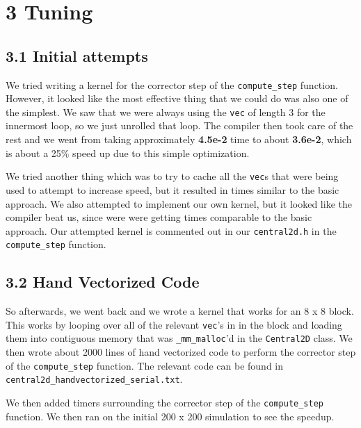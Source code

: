 \documentclass[11pt]{article}
\begin{document}
    \section{3 Tuning}

    \subsection{3.1 Initial attempts}
         We tried writing a kernel for the corrector step of the \texttt{compute\_step} function. However, it looked like the most effective thing that we could do was also one of the simplest. We saw that we were always using the \texttt{vec} of length 3 for the innermost loop, so we just unrolled that loop. The compiler then took care of the rest and we went from taking approximately \textbf{4.5e-2} time to about \textbf{3.6e-2}, which is about a 25\% speed up due to this simple optimization.

         We tried another thing which was to try to cache all the \texttt{vec}s that were being used to attempt to increase speed, but it resulted in times similar to the basic approach. We also attempted to implement our own kernel, but it looked like the compiler beat us, since were were getting times comparable to the basic approach. Our attempted kernel is commented out in our \texttt{central2d.h} in the \texttt{compute\_step} function.

    \subsection{3.2 Hand Vectorized Code}
        So afterwards, we went back and we wrote a kernel that works for an 8 x 8 block. This works by looping over all of the relevant \texttt{vec}'s in in the block and loading them into contiguous memory that was \texttt{\_mm\_malloc}'d in the \texttt{Central2D} class. We then wrote about 2000 lines of hand vectorized code to perform the corrector step of the \texttt{compute\_step} function. The relevant code can be found in \texttt{central2d\_handvectorized\_serial.txt}. 

        We then added timers surrounding the corrector step of the \texttt{compute\_step} function. We then ran on the initial 200 x 200 simulation to see the speedup.
\end{document}
